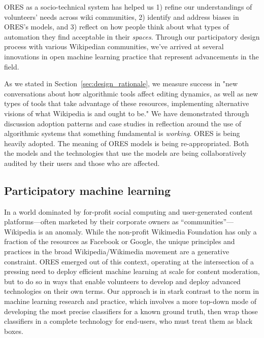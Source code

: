 ORES as a socio-technical system has helped us 1) refine our understandings of volunteers' needs across wiki communities, 2) identify and address biases in ORES's models, and 3) reflect on how people think about what types of automation they find acceptable in their \emph{spaces}.  Through our participatory design process with various Wikipedian communities, we've arrived at several innovations in open machine learning practice that represent advancements in the field.

As we stated in Section~\ref{sec:design_rationale}, we measure success in "new conversations about how algorithmic tools affect editing dynamics, as well as new types of tools that take advantage of these resources, implementing alternative visions of what Wikipedia is and ought to be."  We have demonstrated through discussion adoption patterns and case studies in reflection around the use of algorithmic systems that something fundamental is \emph{working}.  ORES is being heavily adopted.  The meaning of ORES models is being re-appropriated.  Both the models and the technologies that use the models are being collaboratively audited by their users and those who are affected.

\subsection{Participatory machine learning}
In a world dominated by for-profit social computing and user-generated content platforms---often marketed by their corporate owners as ``communities''\cite{gillespie2018custodians}---Wikipedia is an anomaly. While the non-profit Wikimedia Foundation has only a fraction of the resources as Facebook or Google, the unique principles and practices in the broad Wikipedia/Wikimedia movement are a generative constraint. ORES emerged out of this context, operating at the intersection of a pressing need to deploy efficient machine learning at scale for content moderation, but to do so in ways that enable volunteers to develop and deploy advanced technologies on their own terms. Our approach is in stark contrast to the norm in machine learning research and practice, which involves a more top-down mode of developing the most precise classifiers for a known ground truth, then wrap those classifiers in a complete technology for end-users, who must treat them as black boxes.

